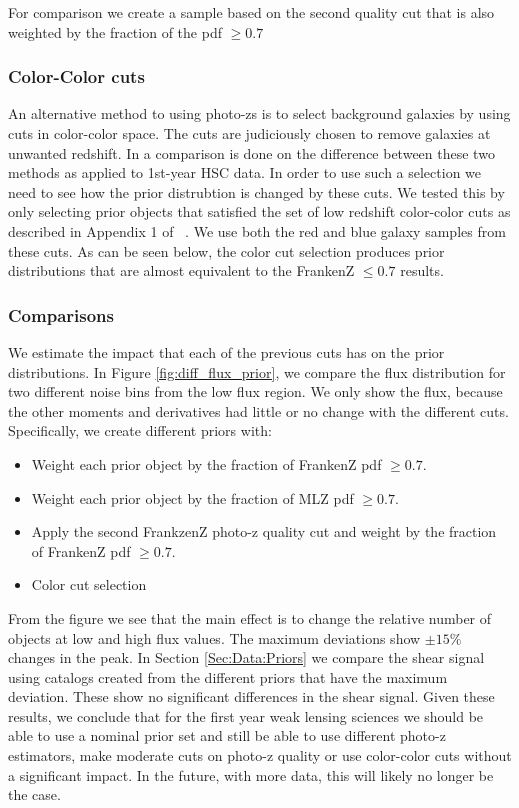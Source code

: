 \documentclass[useAMS,usenatbib]{mnras}
\begin{document}
For comparison we create a sample based on the second quality cut that is also weighted by the fraction of the pdf $\geq 0.7$



\subsubsection{Color-Color cuts}
An alternative method to using photo-zs is to select background galaxies by using cuts in color-color space.  The cuts are judiciously chosen to remove galaxies at unwanted redshift.  In \cite{ClusterSel:inprep} a comparison is done on the difference between these two methods as applied to 1st-year HSC data.  In order to use such a selection we need to see how the prior distrubtion is changed by these cuts.  We tested this by only selecting prior objects that satisfied the set of low redshift color-color cuts as described in Appendix 1 of ~\citep{ClusterSel:inprep}.  We use both the red and blue galaxy samples from these cuts.   As can be seen below, the color cut selection produces prior distributions that are almost equivalent to the FrankenZ $\le 0.7$ results.



\subsubsection{Comparisons}

We estimate the impact that each of the previous cuts has on the prior distributions.  In Figure \ref{fig:diff_flux_prior},  we compare the flux distribution for two different noise bins from the low flux region.  We only show the flux, because the other moments and derivatives had little or no change with the different cuts.  Specifically, we create different priors with:
\begin{itemize}
\item Weight each prior object by the fraction of FrankenZ pdf $\ge 0.7$.
\item Weight each prior object by the fraction of MLZ pdf $\ge 0.7$.
\item Apply the second FrankzenZ photo-z quality cut and weight by the fraction of FrankenZ pdf $\ge 0.7$.
\item Color cut selection
\end{itemize}
From the figure we see that the main effect is to change the relative number of objects at low and high flux values. The maximum deviations show $\pm 15\%$ changes in the peak.  In Section \ref{Sec:Data:Priors} we compare the shear signal using catalogs created from the different priors that have the maximum deviation.  These show no significant differences in the shear signal.  Given these results, we conclude that for the first year weak lensing sciences we should be able to use a nominal prior set and still be able to use different photo-z estimators, make moderate cuts on photo-z quality or use color-color cuts without a significant impact.  In the future, with more data, this will likely no longer be the case.
\end{document}
